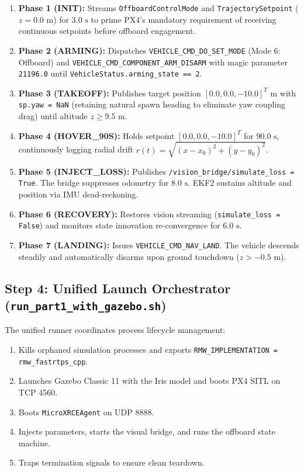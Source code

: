 \documentclass[11pt,a4paper]{article}
\begin{document}
\begin{enumerate}[leftmargin=1.5em, itemsep=3pt]
  \item \textbf{Phase 1 (INIT):} Streams \texttt{OffboardControlMode} and \texttt{TrajectorySetpoint} ($z = 0.0\text{ m}$) for $3.0\text{ s}$ to prime PX4's mandatory requirement of receiving continuous setpoints before offboard engagement.
  \item \textbf{Phase 2 (ARMING):} Dispatches \texttt{VEHICLE\_CMD\_DO\_SET\_MODE} (Mode 6: Offboard) and \texttt{VEHICLE\_CMD\_COMPONENT\_ARM\_DISARM} with magic parameter \texttt{21196.0} until \texttt{VehicleStatus.arming\_state == 2}.
  \item \textbf{Phase 3 (TAKEOFF):} Publishes target position $[0.0, 0.0, -10.0]^T\text{ m}$ with \texttt{sp.yaw = NaN} (retaining natural spawn heading to eliminate yaw coupling drag) until altitude $z \ge 9.5\text{ m}$.
  \item \textbf{Phase 4 (HOVER\_90S):} Holds setpoint $[0.0, 0.0, -10.0]^T$ for $90.0\text{ s}$, continuously logging radial drift $r(t) = \sqrt{(x - x_0)^2 + (y - y_0)^2}$.
  \item \textbf{Phase 5 (INJECT\_LOSS):} Publishes \texttt{/vision\_bridge/simulate\_loss = True}. The bridge suppresses odometry for $8.0\text{ s}$. EKF2 sustains altitude and position via IMU dead-reckoning.
  \item \textbf{Phase 6 (RECOVERY):} Restores vision streaming (\texttt{simulate\_loss = False}) and monitors state innovation re-convergence for $6.0\text{ s}$.
  \item \textbf{Phase 7 (LANDING):} Issues \texttt{VEHICLE\_CMD\_NAV\_LAND}. The vehicle descends steadily and automatically disarms upon ground touchdown ($z > -0.5\text{ m}$).
\end{enumerate}

\subsection{Step 4: Unified Launch Orchestrator (\texttt{run\_part1\_with\_gazebo.sh})}
The unified runner coordinates process lifecycle management:
\begin{enumerate}[leftmargin=1.5em, itemsep=2pt]
  \item Kills orphaned simulation processes and exports \texttt{RMW\_IMPLEMENTATION = rmw\_fastrtps\_cpp}.
  \item Launches Gazebo Classic 11 with the Iris model and boots PX4 SITL on TCP 4560.
  \item Boots \texttt{MicroXRCEAgent} on UDP 8888.
  \item Injects parameters, starts the visual bridge, and runs the offboard state machine.
  \item Traps termination signals to ensure clean teardown.
\end{enumerate}
\end{document}

